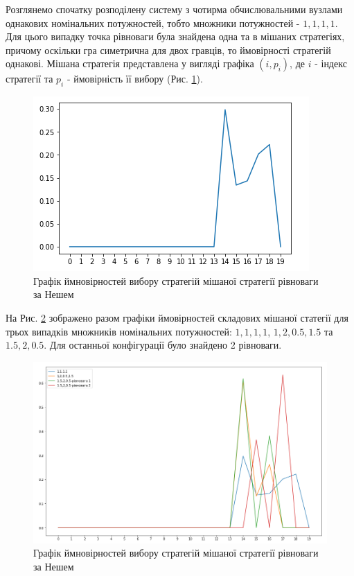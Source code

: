Розглянемо спочатку розподілену систему з чотирма обчислювальними вузлами однакових номінальних потужностей, тобто множники потужностей - $1,1,1,1$. Для цього випадку точка рівноваги була знайдена одна та в мішаних стратегіях, причому оскільки гра симетрична для двох гравців, то ймовірності стратегій однакові. Мішана стратегія представлена у вигляді графіка $(i, p_i)$, де $i$ - індекс стратегії та $p_i$ - ймовірність її вибору (Рис. \ref{fig:nash_strategy_equal}).

\begin{figure}[H]
	\centering
	\includegraphics[width=\textwidth]{practice/img/nash_strategy_equal}
	\caption{Графік ймновірностей вибору стратегій мішаної стратегії рівноваги за Нешем}
	\label{fig:nash_strategy_equal}
\end{figure}

На Рис. \ref{fig:nash_strategy_together} зображено разом графіки ймовірностей складових мішаної статегії для трьох випадків множників номінальних потужностей: $1,1,1,1$, $1,2,0.5,1.5$ та $1.5,2,0.5$. Для останньої конфігурації було знайдено 2 рівноваги.

\begin{figure}[H]
	\centering
	\includegraphics[width=\textwidth]{practice/img/nash_strategy_together}
	\caption{Графік ймновірностей вибору стратегій мішаної стратегії рівноваги за Нешем}
	\label{fig:nash_strategy_together}
\end{figure}






